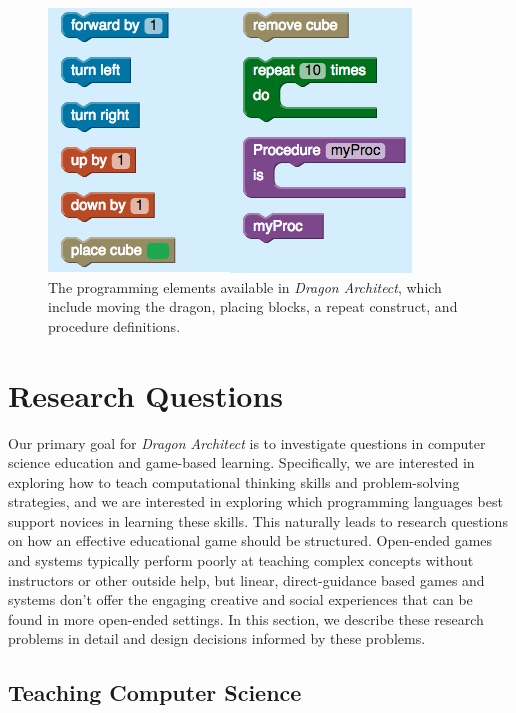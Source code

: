 \documentclass{sig-alternate}
\newcommand{\gametitle}{{\emph{Dragon Architect}}}
\begin{document}
\begin{figure}[htb]
  \centering
  \includegraphics[width=\columnwidth]{images/toolbox-wide}
  \caption{The programming elements available in \gametitle{}, which include moving the dragon, placing blocks, a repeat construct, and procedure definitions.}
  \label{fig:toolbox}
\end{figure}


\section{Research Questions}
\label{sec:research}

Our primary goal for \gametitle{} is to investigate questions in computer science education and game-based learning. 
Specifically, we are interested in exploring how to teach computational thinking skills and problem-solving strategies, and we are interested in exploring which programming languages best support novices in learning these skills. 
This naturally leads to research questions on how an effective educational game should be structured.
Open-ended games and systems typically perform poorly at teaching complex concepts without instructors or other outside help, but linear, direct-guidance based games and systems don't offer the engaging creative and social experiences that can be found in more open-ended settings.
In this section, we describe these research problems in detail and design decisions informed by these problems.

\subsection{Teaching Computer Science}
\end{document}
